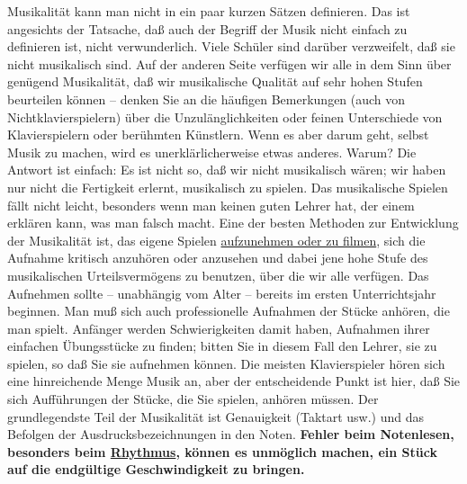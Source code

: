 Musikalität kann man nicht in ein paar kurzen Sätzen definieren.
Das ist angesichts der Tatsache, daß auch der Begriff der Musik nicht einfach zu definieren ist, nicht verwunderlich.
Viele Schüler sind darüber verzweifelt, daß sie nicht musikalisch sind.
Auf der anderen Seite verfügen wir alle in dem Sinn über genügend Musikalität, daß wir musikalische Qualität auf sehr hohen Stufen beurteilen können -- denken Sie an die häufigen Bemerkungen (auch von Nichtklavierspielern) über die Unzulänglichkeiten oder feinen Unterschiede von Klavierspielern oder berühmten Künstlern.
Wenn es aber darum geht, selbst Musik zu machen, wird es unerklärlicherweise etwas anderes.
Warum?
Die Antwort ist einfach: Es ist nicht so, daß wir nicht musikalisch wären; wir haben nur nicht die Fertigkeit erlernt, musikalisch zu spielen.
Das musikalische Spielen fällt nicht leicht, besonders wenn man keinen guten Lehrer hat, der einem erklären kann, was man falsch macht.
Eine der besten Methoden zur Entwicklung der Musikalität ist, das eigene Spielen \hyperref[c1iii13]{aufzunehmen oder zu filmen}, sich die Aufnahme kritisch anzuhören oder anzusehen und dabei jene hohe Stufe des musikalischen Urteilsvermögens zu benutzen, über die wir alle verfügen.
Das Aufnehmen sollte -- unabhängig vom Alter -- bereits im ersten Unterrichtsjahr beginnen.
Man muß sich auch professionelle Aufnahmen der Stücke anhören, die man spielt.
Anfänger werden Schwierigkeiten damit haben, Aufnahmen ihrer einfachen Übungsstücke zu finden; bitten Sie in diesem Fall den Lehrer, sie zu spielen, so daß Sie sie aufnehmen können.
Die meisten Klavierspieler hören sich eine hinreichende Menge Musik an, aber der entscheidende Punkt ist hier, daß Sie sich Aufführungen der Stücke, die Sie spielen, anhören müssen.
Der grundlegendste Teil der Musikalität ist Genauigkeit (Taktart usw.) und das Befolgen der Ausdrucksbezeichnungen in den Noten.
\textbf{Fehler beim Notenlesen, besonders beim \hyperref[c1iii1b]{Rhythmus}, können es unmöglich machen, ein Stück auf die endgültige Geschwindigkeit zu bringen.}


